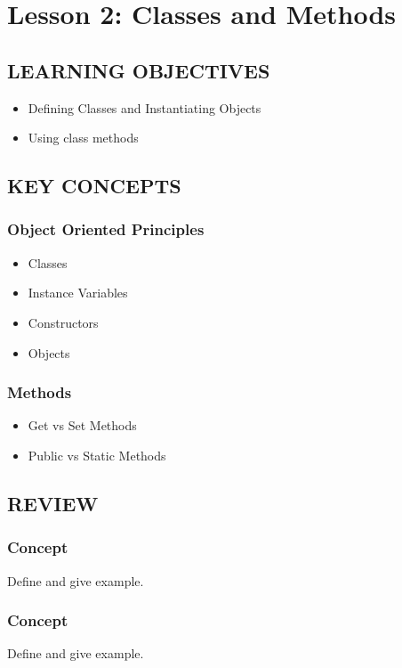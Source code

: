 \documentclass[14pt]{extreport}%
\begin{document}
\setcounter{chapter}{0}
\chapter{\Large{\textbf{Lesson 2}: Classes and Methods}}

\vspace{-10pt}

\section*{LEARNING OBJECTIVES}
\begin{itemize}
    \item Defining Classes and Instantiating Objects
    \item Using class methods 
\end{itemize}

\section*{KEY CONCEPTS}
\subsection*{Object Oriented Principles}
\begin{itemize}
    \item Classes
    \item Instance Variables
    \item Constructors
    \item Objects
\end{itemize}
\subsection*{Methods}
\begin{itemize}
    \item Get vs Set Methods
    \item Public vs Static Methods
\end{itemize}


\section*{REVIEW}
\subsection*{Concept}
Define and give example.
\subsection*{Concept}
Define and give example.
    
\end{document}
